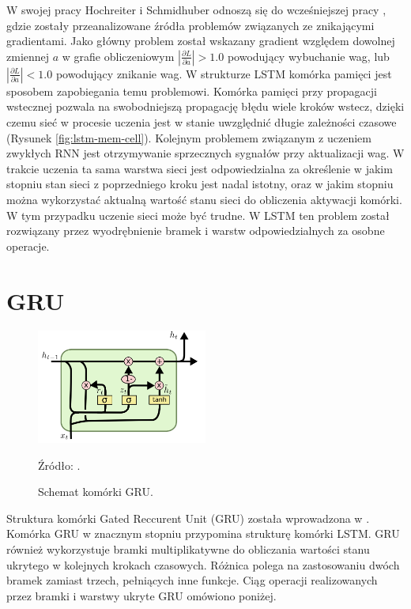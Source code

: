 \documentclass[oneside, mag]{mgr}
\begin{document}
W swojej pracy \cite{LSTM} Hochreiter i Schmidhuber odnoszą się do wcześniejszej pracy \cite{vanishing_gradient_RNN}, gdzie zostały przeanalizowane źródła problemów związanych ze znikającymi gradientami. Jako główny problem został wskazany gradient względem dowolnej zmiennej $a$ w grafie obliczeniowym $|\frac{\partial L}{\partial a}| > 1.0$ powodujący wybuchanie wag, lub $|\frac{\partial L}{\partial a}| < 1.0$ powodujący znikanie wag. W strukturze LSTM komórka pamięci jest sposobem zapobiegania temu problemowi. Komórka pamięci przy propagacji wstecznej pozwala na swobodniejszą propagację błędu wiele kroków wstecz, dzięki czemu sieć w procesie uczenia jest w stanie uwzględnić długie zależności czasowe (Rysunek \ref{fig:lstm-mem-cell}). Kolejnym problemem związanym z uczeniem zwykłych RNN jest otrzymywanie sprzecznych sygnałów przy aktualizacji wag. W trakcie uczenia ta sama warstwa sieci jest odpowiedzialna za określenie w jakim stopniu stan sieci z poprzedniego kroku jest nadal istotny, oraz w jakim stopniu można wykorzystać aktualną wartość stanu sieci do obliczenia aktywacji komórki. W tym przypadku uczenie sieci może być trudne. W LSTM ten problem został rozwiązany przez wyodrębnienie bramek i warstw odpowiedzialnych za osobne operacje.  

\section{GRU}

\begin{figure}
\centering
	\includegraphics[width=0.5\textwidth]{img/LSTM3-var-GRU.png}
	\caption{Schemat komórki GRU.} Źródło: \cite{colah}.
	\label{fig:gru}
\end{figure}

Struktura komórki Gated Reccurent Unit (GRU) została wprowadzona w \cite{DBLP:journals/corr/ChoMGBSB14}. Komórka GRU w znacznym stopniu przypomina strukturę komórki LSTM. GRU również wykorzystuje bramki multiplikatywne do obliczania wartości stanu ukrytego w kolejnych krokach czasowych. Różnica polega na zastosowaniu dwóch bramek zamiast trzech, pełniących inne funkcje. Ciąg operacji realizowanych przez bramki i warstwy ukryte GRU omówiono poniżej.
\end{document}
